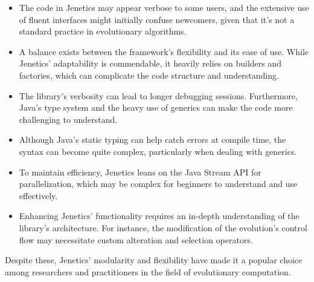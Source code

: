   \begin{itemize}
    \item The code in Jenetics may appear verbose to some users, and the
    extensive use of fluent interfaces might initially confuse newcomers, given
    that it's not a standard practice in evolutionary algorithms.
    \item A balance exists between the framework's flexibility and its ease of
    use.
    While Jenetics' adaptability is commendable, it heavily relies on builders
    and factories, which can complicate the code structure and understanding.
    \item The library's verbosity can lead to longer debugging sessions.
    Furthermore, Java's type system and the heavy use of generics can make the
    code more challenging to understand.
    \item Although Java's static typing can help catch errors at compile time,
    the syntax can become quite complex, particularly when dealing with
    generics.
    \item To maintain efficiency, Jenetics leans on the Java Stream API for
    parallelization, which may be complex for beginners to understand and use
    effectively.
    \item Enhancing Jenetics' functionality requires an in-depth understanding
    of the library's architecture.
    For instance, the modification of the evolution's control flow may
    necessitate custom alteration and selection operators.
  \end{itemize}

  Despite these, Jenetics' modularity and flexibility have made it a popular
  choice among researchers and practitioners in the field of evolutionary
  computation.
